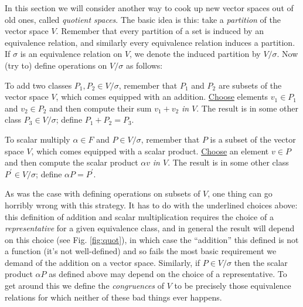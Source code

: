 \documentclass{memoir}
\begin{document}
In this section we will consider another way to cook up new vector spaces out of old ones, called \emph{quotient spaces}. The basic idea is this: take a \emph{partition} of the vector space $V$. Remember that every partition of a set is induced by an equivalence relation, and similarly every equivalence relation induces a partition. If $\sigma$ is an equivalence relation on $V$, we denote the induced partition by $V/\sigma$. Now (try to) define operations on $V/\sigma$ as follows:

\begin{enumerate*}
\item To add two classes $P_1, P_2 \in V/\sigma$, remember that $P_1$ and $P_2$ are subsets of the vector space $V$, which comes equipped with an addition. \underline{Choose} elements $v_1 \in P_1$ and $v_2 \in P_2$ and then compute their sum $v_1+v_2$ \emph{in $V$}. The result is in some other class $P_3 \in V/\sigma$; define $P_1 + P_2 = P_3$.
\item To scalar multiply $\alpha \in F$ and $P \in V/\sigma$, remember that $P$ is a subset of the vector space $V$, which comes equipped with a scalar product. \underline{Choose} an element $v \in P$ and then compute the scalar product $\alpha v$ \emph{in $V$}. The result is in some other class $P^\prime \in V/\sigma$; define $\alpha P = P^\prime$.
\end{enumerate*}

As was the case with defining operations on subsets of $V$, one thing can go horribly wrong with this strategy. It has to do with the underlined choices above: this definition of addition and scalar multiplication requires the choice of a \emph{representative} for a given equivalence class, and in general the result will depend on this choice (see Fig. \ref{fig:quot}), in which case the ``addition'' this defined is not a function (it's not well-defined) and so fails the most basic requirement we demand of the addition on a vector space. Similarly, if $P \in V/\sigma$ then the scalar product $\alpha P$ as defined above may depend on the choice of a representative. To get around this we define the \emph{congruences} of $V$ to be precisely those equivalence relations for which neither of these bad things ever happens.
\end{document}
